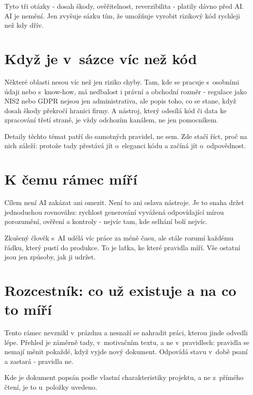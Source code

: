 Tyto tři otázky - dosah škody, ověřitelnost, reverzibilita - platily dávno před AI.
AI je nemění.
Jen zvyšuje sázku tím, že umožňuje vyrobit rizikový kód rychleji než kdy dřív.

\section{Když je v~sázce víc než kód}

Některé oblasti nesou víc než jen riziko chyby.
Tam, kde se pracuje s~osobními údaji nebo s~know-how, má nedbalost i právní a obchodní rozměr - regulace jako NIS2 nebo GDPR nejsou jen administrativa, ale popis toho, co se stane, když dosah škody překročí hranici firmy.
A nástroj, který odesílá kód či data ke zpracování třetí straně, je vždy odchozím kanálem, ne jen pomocníkem.

Detaily těchto témat patří do samotných pravidel, ne sem.
Zde stačí říct, proč na nich záleží: protože tady přestává jít o~eleganci kódu a začíná jít o~odpovědnost.

\section{K čemu rámec míří}

Cílem není AI zakázat ani omezit.
Není to ani oslava nástroje.
Je to snaha držet jednoduchou rovnováhu: rychlost generování vyvážená odpovídající mírou porozumění, ověření a kontroly - nejvíc tam, kde selhání bolí nejvíc.

Zkušený člověk s~AI udělá víc práce za méně času, ale stále rozumí každému řádku, který pustí do produkce.
To je laťka, ke které pravidla míří.
Vše ostatní jsou jen způsoby, jak ji udržet.

\section{Rozcestník: co už existuje a na co to míří}

Tento rámec nevznikl v~prázdnu a nesnaží se nahradit práci, kterou jinde odvedli lépe.
Přehled je záměrně tady, v~motivačním textu, a ne v~pravidlech: pravidla se nemají měnit pokaždé, když vyjde nový dokument.
Odpovídá stavu v~době psaní a zastará - pravidla ne.

Kde je dokument popsán podle vlastní charakteristiky projektu, a ne z~přímého čtení, je to u~položky uvedeno.

